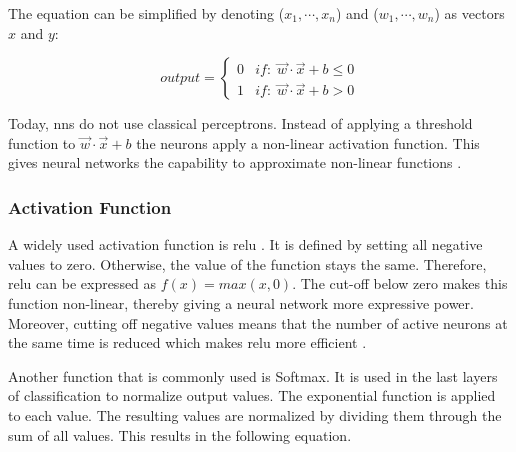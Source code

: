 The equation can be simplified by denoting ($x_1, \cdots, x_n$) and ($w_1, \cdots, w_n$) as vectors $x$ and $y$:

\begin{equation}
    output = 
    \begin{cases}\label{eq:PerceptronVector}
    0 & if:\; \vec{w} \cdot \vec{x} + b \le 0 \\
    1 & if:\; \vec{w} \cdot \vec{x} + b > 0
    \end{cases}
\end{equation}

Today, \acp{nn} do not use classical perceptrons. Instead of applying a threshold function to $\vec{w} \cdot \vec{x} + b$ the neurons apply a non-linear activation function. This gives neural networks the capability to approximate non-linear functions \cite{cybenko1989approximation, hornik1991approximation, sharma2020activation}.

\subsubsection{Activation Function}
\label{sec:Foundations:NeuralNetworks:ActivationFunction}

A widely used activation function is \ac{relu} . It is defined by setting all negative values to zero. Otherwise, the value of the function stays the same. Therefore, \ac{relu} can be expressed as $f(x)  = max(x,0)$. The cut-off below zero makes this function non-linear, thereby giving a neural network more expressive power. Moreover, cutting off negative values means that the number of active neurons at the same time is reduced which makes \ac{relu} more efficient \cite{sharma2020activation}.

Another function that is commonly used is Softmax. It is used in the last layers of classification to normalize output values. The exponential function is applied to each value. The resulting values are normalized by dividing them through the sum of all values. This results in the following equation.




